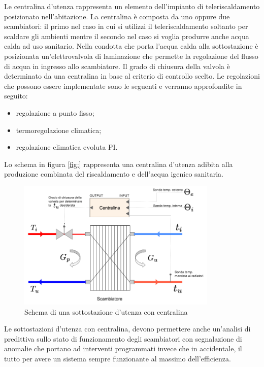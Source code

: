 \documentclass[laurea,oneside,11pt]{USiena_tesiLM}
\begin{document}
Le centralina d'utenza rappresenta un elemento dell'impianto di teleriscaldamento posizionato nell'abitazione. La centralina è composta da uno oppure due scambiatori: il primo nel caso in cui si utilizzi il teleriscaldamento soltanto per scaldare gli ambienti mentre il secondo nel caso si voglia produrre anche acqua calda ad uso sanitario. Nella condotta che porta l'acqua calda alla sottostazione è posizionata un'elettrovalvola di laminazione  che permette la regolazione del flusso di acqua in ingresso allo scambiatore. Il grado di chiusura della valvola è determinato da una centralina in base al criterio di controllo scelto. Le regolazioni che possono essere implementate sono le seguenti e verranno approfondite in seguito:

\begin{itemize}
\item regolazione a punto fisso;
\item termoregolazione climatica;
\item regolazione climatica evoluta PI.
\end{itemize}  

Lo schema in figura \ref{fig:} rappresenta una centralina d'utenza adibita alla produzione combinata del riscaldamento e dell'acqua igenico sanitaria.

\begin{figure}[!ht]
\centering
\includegraphics[width=0.85\textwidth]{figure/centralina} 
\caption{Schema di una sottostazione d'utenza con centralina}
\label{fig:centralina}
\end{figure}


Le sottostazioni d'utenza con centralina, devono permettere anche un'analisi di predittiva sullo stato di funzionamento degli scambiatori con segnalazione di anomalie che portano ad interventi programmati invece che in accidentale, il tutto per avere un sistema sempre funzionante al massimo dell'efficienza.
\end{document}

